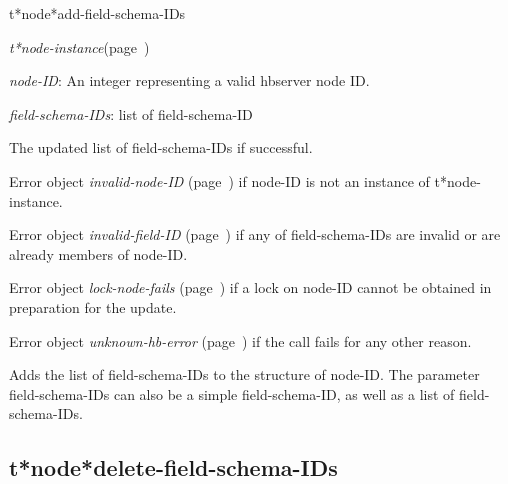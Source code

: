 \begin{description}
\item [Name:]  t*node*add-field-schema-IDs

\item [Class:] {\sl t*node-instance}\hfill(page~\pageref{t*node-instance})

\item [Parameters:]
\item {\sl node-ID}:   An integer representing
a valid hbserver node ID.

\item {\sl field-schema-IDs}:  list of field-schema-ID


\item [Return-value:]
The updated list of field-schema-IDs if successful.

Error object {\sl invalid-node-ID} (page~\pageref{invalid-node-ID}) if node-ID is not an
instance of t*node-instance.

Error object {\sl invalid-field-ID} (page~\pageref{invalid-field-ID}) if any of 
field-schema-IDs are invalid or are already members of 
node-ID.

Error object {\sl lock-node-fails} (page~\pageref{lock-node-fails}) if a lock on node-ID
cannot be obtained in preparation for the update.

Error object {\sl unknown-hb-error} (page~\pageref{unknown-hb-error}) if the call fails
for any other reason. 

\item [Description:]

Adds the list of field-schema-IDs to the structure of
node-ID. The parameter field-schema-IDs can also be a 
simple field-schema-ID, as well as a list of 
field-schema-IDs.


\item [Public:]



\end{description}
\horizontalline

\subsection{t*node*delete-field-schema-IDs}
\label{t*node*delete-field-schema-IDs}


